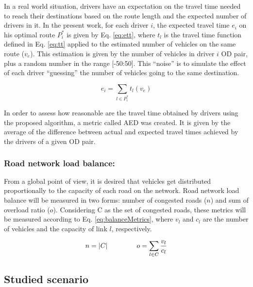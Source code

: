 \documentclass[12pt]{llncs}
\newcommand{\optRoute}[1]{\ensuremath{P_#1^*}}	%
\newcommand{\travTime}{\ensuremath{t_l}} 	%
\newcommand{\linkCap}{\ensuremath{c_l}}		%
\newcommand{\veh}{\ensuremath{v}}		%
\newcommand{\ett}[1]{\ensuremath{e_#1}}		%
\newcommand{\expVeh}{\ensuremath{v_e}}		%
\newcommand{\congRoads}{\ensuremath{C}}		%
\newcommand{\numCong}{\ensuremath{n}}		%
\newcommand{\overLoadRatio}{\ensuremath{o}}	%
\begin{document}
In a real world situation, drivers have an expectation on the travel time needed to reach their destinations based on the route length and the expected number of drivers in it. In the present work, for each driver $i$, the expected travel time $\ett{i}$ on his optimal route \optRoute{i} is given by Eq. \eqref{eq:ett}, where $\travTime$ is the travel time function defined in Eq. \eqref{eq:tt} applied to the estimated number of vehicles on the same route ($\expVeh$). This estimation is given by the number of vehicles in driver $i$ OD pair, plus a random number in the range [-50:50]. This ``noise'' is to simulate the effect of each driver ``guessing'' the number of vehicles going to the same destination.

\begin{equation}
\label{eq:ett}
\ett{i} = \sum_{l \in \optRoute{i}}\travTime(\expVeh)
\end{equation}

In order to assess how reasonable are the travel time obtained by drivers using the proposed algorithm, a metric called AED was created. It is given by the average of the difference between actual and expected travel times achieved by the drivers of a given OD pair.

\subsubsection{Road network load balance:}

From a global point of view, it is desired that vehicles get distributed proportionally to the capacity of each road on the network. %
Road network load balance will be measured in two forms: number of congested roads ($n$) and sum of overload ratio ($o$). Considering C as the set of congested roads, these metrics will be measured according to Eq. \eqref{eq:balanceMetrics}, where $\veh_l$ and $\linkCap$ are the number of vehicles and the capacity of link $l$, respectively.

\begin{equation}
\label{eq:balanceMetrics}
\numCong = |\congRoads| \hspace{1.5cm}  \overLoadRatio = \sum_{l \in \congRoads} \frac{\veh_l}{\linkCap}
\end{equation}


\subsection{Studied scenario}
\end{document}

